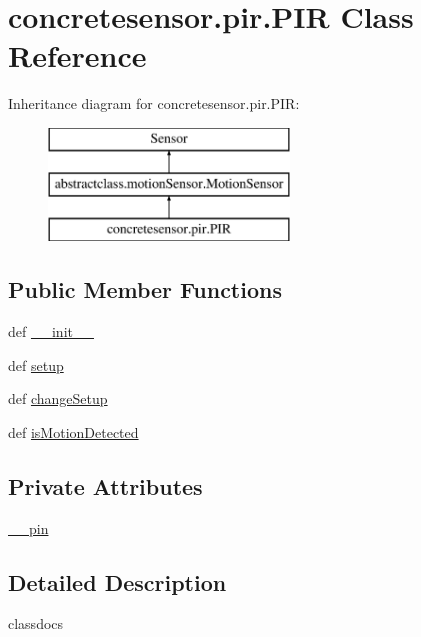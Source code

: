 \hypertarget{classconcretesensor_1_1pir_1_1PIR}{}\section{concretesensor.\+pir.\+P\+I\+R Class Reference}
\label{classconcretesensor_1_1pir_1_1PIR}
Inheritance diagram for concretesensor.\+pir.\+P\+I\+R\+:\begin{figure}[H]
\begin{center}
\leavevmode
\includegraphics[height=3.000000cm]{classconcretesensor_1_1pir_1_1PIR}
\end{center}
\end{figure}
\subsection*{Public Member Functions}
\begin{DoxyCompactItemize}
\item 
def \hyperlink{classconcretesensor_1_1pir_1_1PIR_a598a4d1392f0f7edfa72a82c1b04a1e2}{\+\_\+\+\_\+init\+\_\+\+\_\+}
\item 
def \hyperlink{classconcretesensor_1_1pir_1_1PIR_a8cc11dbc5f752db539c1b602d165c4d9}{setup}
\item 
def \hyperlink{classconcretesensor_1_1pir_1_1PIR_a4be0e5a32a5a5050a1644bc2788e2065}{change\+Setup}
\item 
def \hyperlink{classconcretesensor_1_1pir_1_1PIR_a810c10b80dac647032e9e0750ac73b7a}{is\+Motion\+Detected}
\end{DoxyCompactItemize}
\subsection*{Private Attributes}
\begin{DoxyCompactItemize}
\item 
\hyperlink{classconcretesensor_1_1pir_1_1PIR_ab2cd2c7dbe6bc8e8940ac106c90cb239}{\+\_\+\+\_\+pin}
\end{DoxyCompactItemize}


\subsection{Detailed Description}
\begin{DoxyVerb}classdocs
\end{DoxyVerb}
 

